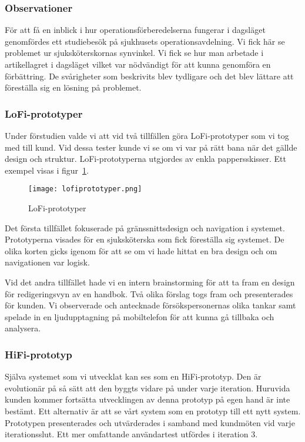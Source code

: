 
\subsubsection{Observationer}
För att få en inblick i hur operationsförberedelserna fungerar i dagsläget genomfördes ett studiebesök på sjukhusets operationsavdelning. Vi fick här se problemet ur sjuksköterskornas synvinkel. Vi fick se hur man arbetade i artikellagret i dagsläget vilket var nödvändigt för att kunna genomföra en förbättring. De svårigheter som beskrivits blev tydligare och det blev lättare att föreställa sig en lösning på problemet.

\subsubsection{LoFi-prototyper}
Under förstudien valde vi att vid två tillfällen göra LoFi-prototyper som vi tog med till kund. Vid dessa tester kunde vi se om vi var på rätt bana när det gällde design och struktur. LoFi-prototyperna utgjordes av enkla pappersskisser. Ett exempel visas i figur~\ref{fig:lofiprototyper}.
\begin{figure}[htbp]
\begin{center}
\texttt{[image: lofiprototyper.png]}
\caption{LoFi-prototyper}
\label{fig:lofiprototyper}
\end{center}
\end{figure}

Det första tillfället fokuserade på gränssnittsdesign och navigation i systemet. Prototyperna visades för en sjuksköterska som fick föreställa sig systemet. De olika korten gicks igenom för att se om vi hade hittat en bra design och om navigationen var logisk.

Vid det andra tillfället hade vi en intern brainstorming för att ta fram en design för redigeringsvyn av en handbok. Två olika förslag togs fram och presenterades för kunden. Vi observerade och antecknade försökspersonernas olika tankar samt spelade in en ljudupptagning på mobiltelefon för att kunna gå tillbaka och analysera.
\subsubsection{HiFi-prototyp}
Själva systemet som vi utvecklat kan ses som en HiFi-prototyp. Den är evolutionär på så sätt att den byggts vidare på under varje iteration. Huruvida kunden kommer fortsätta utvecklingen av denna prototyp på egen hand är inte bestämt. Ett alternativ är att se vårt system som en prototyp till ett nytt system. 
Prototypen presenterades och utvärderades i samband med kundmöten vid varje iterationsslut. Ett mer omfattande användartest utfördes i iteration 3.



